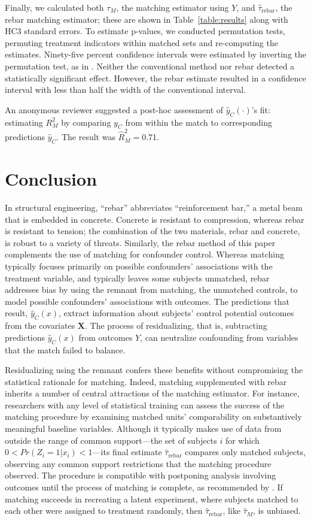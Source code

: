 \documentclass[12pt]{article}\usepackage[]{graphicx}\usepackage[]{color}
\newcommand{\est}{\hat{\tau}_{\text{rebar}}}
\newcommand{\yhat}{\hat{y}_C}
\newcommand{\Match}{M}
\newcommand{\algorithm}{\hat{y}_C(\cdot)}
\newcommand{\covMat}{\bm{X}}
\newcommand{\covVec}{x}
\begin{document}
Finally, we calculated both $\tau_\Match$, the matching estimator
using $Y$, and $\est$, the rebar matching estimator; these are shown
in Table~\ref{table:results} along with HC3 standard errors.
To estimate p-values, we conducted permutation tests, permuting treatment indicators within matched sets and re-computing the estimates.
Ninety-five percent confidence intervals were estimated by inverting the permutation test, as in \citet[e.g.][]{rosenbaum2002covariance}.
Neither the conventional method nor rebar detected a statistically significant effect.
However, the rebar estimate resulted in a confidence interval with less than half the width of the conventional interval.

An anonymous reviewer suggested a post-hoc assessment of $\algorithm$'s
fit: estimating $R^2_\Match$ by comparing $y_C$ from within the
match to corresponding predictions $\hat{y}_C$.
The result was $\hat{R}^2_\Match=$0.71.


\section{Conclusion}\label{sec:conclusion}

In structural engineering, ``rebar'' abbreviates ``reinforcement
bar,'' a metal beam that is embedded in concrete. Concrete is resistant to compression, whereas rebar is resistant to tension; the combination of the two materials, rebar and concrete, is robust to a variety of threats.
Similarly, the rebar method of this paper complements the use of matching for confounder control.
Whereas matching typically focuses primarily on possible confounders'
associations with the treatment variable, and typically leaves some
subjects unmatched, rebar addresses bias by using the remnant from
matching, the unmatched controls, to model possible confounders'
associations with outcomes.
The predictions that result, $\yhat (\covVec)$, extract information about
subjects' control potential outcomes from the covariates $\covMat$.
The process of residualizing, that is, subtracting predictions
$\yhat (\covVec)$ from outcomes $Y$, can neutralize confounding from variables that the
match failed to balance.

Residualizing using the remnant confers these benefits without
compromising the statistical rationale for matching.
Indeed, matching supplemented with rebar inherits a number of central
attractions of the matching estimator.  For instance, researchers with
any level of statistical training can assess the success of the
matching procedure by examining matched units' comparability on
substantively meaningful baseline variables.  Although it typically
makes use of data from outside the range of common support---the set
of subjects $i$ for which $0<Pr(Z_i=1|\covVec_i)<1$---its final
estimate $\est$ compares only matched subjects, observing any common
support restrictions that the matching procedure observed.  The
procedure is compatible with postponing analysis involving outcomes
until the process of matching is complete, as recommended by
\citet{rubin2008objective}.  If matching succeeds in recreating a
latent experiment, where subjects matched to each other were assigned
to treatment randomly, then $\est$, like
$\hat{\tau}_\Match$, is unbiased.
\end{document}

